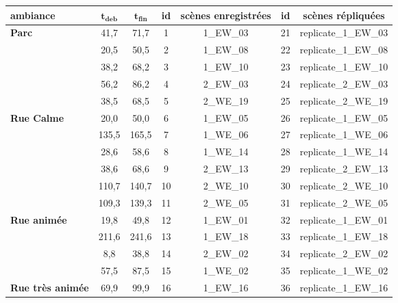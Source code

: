 \begin{table}[ht]
\centering
\begin{tabular}{|p{2cm}|c|c||c|c||c|c|}
\toprule
\textbf{ambiance}                          & $\mathbf{t_{deb}}$          & $\mathbf{t_{fin}}$          & \textbf{id}   & \textbf{scènes enregistrées}         & \textbf{id}   & \textbf{scènes répliquées} \\
\midrule
\multirow{5}{2cm}{\textbf{Parc}}             & 41,7 & 71,7 & 1  & 1\_EW\_03 & 21 & replicate\_1\_EW\_03         \\
                                  & 20,5 & 50,5 & 2  & 1\_EW\_08 & 22 & replicate\_1\_EW\_08         \\
                                  & 38,2 & 68,2 & 3  & 1\_EW\_10 & 23 & replicate\_1\_EW\_10         \\
                                  & 56,2 & 86,2 & 4  & 2\_EW\_03 & 24 & replicate\_2\_EW\_03         \\
                                  & 38,5 & 68,5 & 5  & 2\_WE\_19 & 25 & replicate\_2\_WE\_19         \\
\hline
\multirow{6}{2cm}{\textbf{Rue Calme}}        & 20,0 & 50,0 & 6  & 1\_EW\_05 & 26 & replicate\_1\_EW\_05     \\
                                  & 135,5 & 165,5 & 7  & 1\_WE\_06 & 27 & replicate\_1\_WE\_06     \\
                                  & 28,6 & 58,6 & 8  & 1\_WE\_14 & 28 & replicate\_1\_WE\_14     \\
                                  & 38,6 & 68,6 & 9  & 2\_EW\_13 & 29 & replicate\_2\_EW\_13     \\
                                  & 110,7 & 140,7 & 10 & 2\_WE\_10 & 30 & replicate\_2\_WE\_10     \\
                                  & 109,3 & 139,3 & 11 & 2\_WE\_05 & 31 & replicate\_2\_WE\_05     \\
\hline
\multirow{4}{2cm}{\textbf{Rue animée}}       & 19,8 & 49,8 & 12 & 1\_EW\_01 & 32 & replicate\_1\_EW\_01     \\
                                  & 211,6 & 241,6 & 13 & 1\_EW\_18 & 33 & replicate\_1\_EW\_18     \\
                                  & 8,8 & 38,8 & 14 & 2\_EW\_02 & 34 & replicate\_2\_EW\_02     \\
                                  & 57,5 & 87,5 & 15 & 1\_WE\_02 & 35 & replicate\_1\_WE\_02     \\
\hline
\multirow{5}{2cm}{\textbf{Rue très  animée}} & 69,9 & 99,9 & 16 & 1\_EW\_16 & 36 & replicate\_1\_EW\_16 \\

\end{tabular}
\end{table}

